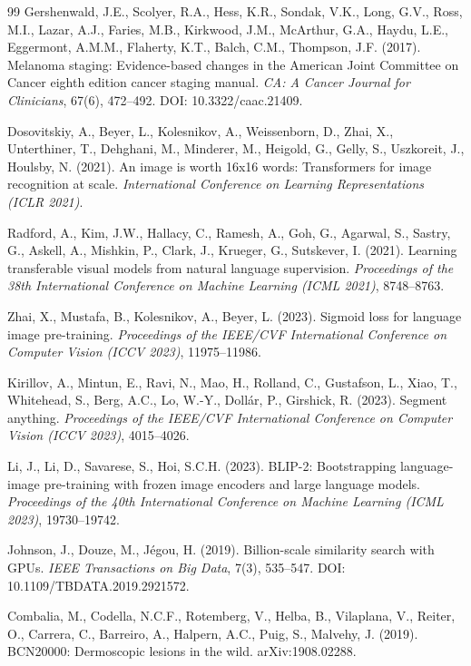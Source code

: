 \begin{thebibliography}{99}
Gershenwald, J.E., Scolyer, R.A., Hess, K.R., Sondak, V.K., Long, G.V., Ross, M.I., Lazar, A.J., Faries, M.B., Kirkwood, J.M., McArthur, G.A., Haydu, L.E., Eggermont, A.M.M., Flaherty, K.T., Balch, C.M., Thompson, J.F. (2017). Melanoma staging: Evidence-based changes in the American Joint Committee on Cancer eighth edition cancer staging manual. \emph{CA: A Cancer Journal for Clinicians}, 67(6), 472--492. DOI: 10.3322/caac.21409.

Dosovitskiy, A., Beyer, L., Kolesnikov, A., Weissenborn, D., Zhai, X., Unterthiner, T., Dehghani, M., Minderer, M., Heigold, G., Gelly, S., Uszkoreit, J., Houlsby, N. (2021). An image is worth 16x16 words: Transformers for image recognition at scale. \emph{International Conference on Learning Representations (ICLR 2021)}.

Radford, A., Kim, J.W., Hallacy, C., Ramesh, A., Goh, G., Agarwal, S., Sastry, G., Askell, A., Mishkin, P., Clark, J., Krueger, G., Sutskever, I. (2021). Learning transferable visual models from natural language supervision. \emph{Proceedings of the 38th International Conference on Machine Learning (ICML 2021)}, 8748--8763.

Zhai, X., Mustafa, B., Kolesnikov, A., Beyer, L. (2023). Sigmoid loss for language image pre-training. \emph{Proceedings of the IEEE/CVF International Conference on Computer Vision (ICCV 2023)}, 11975--11986.

Kirillov, A., Mintun, E., Ravi, N., Mao, H., Rolland, C., Gustafson, L., Xiao, T., Whitehead, S., Berg, A.C., Lo, W.-Y., Dollár, P., Girshick, R. (2023). Segment anything. \emph{Proceedings of the IEEE/CVF International Conference on Computer Vision (ICCV 2023)}, 4015--4026.

Li, J., Li, D., Savarese, S., Hoi, S.C.H. (2023). BLIP-2: Bootstrapping language-image pre-training with frozen image encoders and large language models. \emph{Proceedings of the 40th International Conference on Machine Learning (ICML 2023)}, 19730--19742.

Johnson, J., Douze, M., Jégou, H. (2019). Billion-scale similarity search with GPUs. \emph{IEEE Transactions on Big Data}, 7(3), 535--547. DOI: 10.1109/TBDATA.2019.2921572.

Combalia, M., Codella, N.C.F., Rotemberg, V., Helba, B., Vilaplana, V., Reiter, O., Carrera, C., Barreiro, A., Halpern, A.C., Puig, S., Malvehy, J. (2019). BCN20000: Dermoscopic lesions in the wild. arXiv:1908.02288.


\end{thebibliography}
